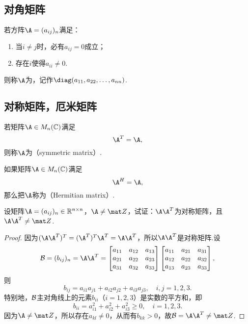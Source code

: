 \subsection{对角矩阵}
\begin{definition}
若方阵\(\A=(a_{ij})_n\)满足：
\begin{enumerate}
\item 当\(i \neq j\)时，必有\(a_{ij} = 0\)成立；
\item 存在\(i\)使得\(a_{ii} \neq 0\).
\end{enumerate}
则称\(\A\)为，记作\(\diag(a_{11},a_{22},\dotsc,a_{nn})\).
\end{definition}

\subsection{对称矩阵，厄米矩阵}
\begin{definition}
若矩阵\(\A \in M_n(\mathbb{C})\)满足\[
    \A^T = \A,
\]
则称\(\A\)为（symmetric matrix）.
\end{definition}

\begin{definition}
如果矩阵\(\A \in M_n(\mathbb{C})\)满足\[
    \A^H = \A,
\]
那么把\(\A\)称为（Hermitian matrix）.
\end{definition}


\begin{example}
设矩阵\(\A = (a_{ij})_n \in \mathbb{R}^{n \times n}\)，\(\A \neq \z\)，试证：\(\A \A^T\)为对称矩阵，且\(\A \A^T \neq \z\).
\begin{proof}
因为\((\A \A^T)^T = (\A^T)^T \A^T = \A \A^T\)，所以\(\A \A^T\)是对称矩阵.设\[
\B = (b_{ij})_n = \A \A^T = \begin{bmatrix}
a_{11} & a_{12} & a_{13} \\
a_{21} & a_{22} & a_{23} \\
a_{31} & a_{32} & a_{33} \\
\end{bmatrix} \begin{bmatrix}
a_{11} & a_{21} & a_{31} \\
a_{12} & a_{22} & a_{32} \\
a_{13} & a_{23} & a_{33} \\
\end{bmatrix},
\]则\[
b_{ij} = a_{i1} a_{j1} + a_{i2} a_{j2} + a_{i3} a_{j3},
\quad i,j=1,2,3.
\]特别地，\(\mathcal{B}\)主对角线上的元素\(b_{ii}\)（\(i=1,2,3\)）是实数的平方和，即\[
b_{ii} = a_{i1}^2 + a_{i2}^2 + a_{i3}^2 \geqslant 0,
\quad i=1,2,3.
\]因为\(\A \neq \z\)，所以存在\(a_{kl} \neq 0\)，从而有\(b_{kk} > 0\)，故\(\B = \A \A^T \neq \z\).
\end{proof}
\end{example}


